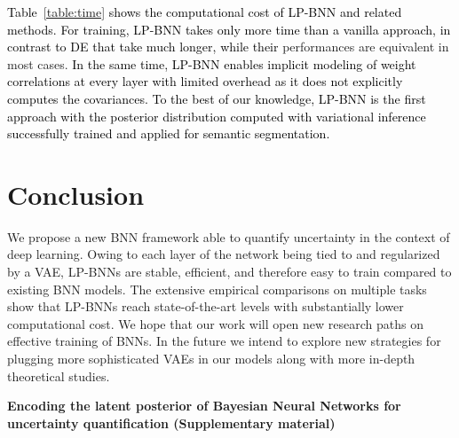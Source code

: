 \documentclass[10pt,twocolumn,letterpaper]{article}
\newcommand\Gianni{\textcolor{black}}
\newcommand{\ab}[1]{\textcolor{black}{#1}}
\begin{document}
\Gianni{Table~\ref{table:time} shows the computational cost of LP-BNN \ab{and related methods}. \ab{For training,} LP-BNN
\ab{takes only  more time than a vanilla approach, in contrast} to} 
\ab{DE} 
\ab{that take much longer, }
\ab{while their} performances are equivalent in most cases. 
\ab{In the same time, LP-BNN enables implicit modeling of weight correlations at every layer with limited overhead as it does not explicitly computes the covariances.}
\ab{To the best of our knowledge, LP-BNN is the first approach with the posterior distribution computed with variational inference successfully trained and applied for semantic segmentation.}


 
 



   
%
 
\section{Conclusion}
We propose a new BNN framework able to quantify uncertainty in the context of deep learning. Owing to each layer of the network being tied to and regularized by a VAE, LP-BNNs are stable, efficient, and therefore easy to train compared to existing BNN models. The extensive empirical comparisons on multiple tasks show that LP-BNNs reach state-of-the-art levels with substantially lower computational cost. We hope that our work will open new research paths on effective training of BNNs. In the future we intend to explore new strategies for plugging more sophisticated VAEs in our models along with more in-depth theoretical studies.

\clearpage
{\small


}

\clearpage



\clearpage
\begin{widetext}
\begin{center}
\textbf{\large Encoding the latent posterior of Bayesian Neural Networks for uncertainty quantification (Supplementary material)}
\end{center}
\end{widetext}

\setcounter{section}{0}
\setcounter{equation}{0}
\setcounter{figure}{0}
\setcounter{table}{0}


\renewcommand{\theequation}{S\arabic{equation}}
\renewcommand{\thefigure}{S\arabic{figure}}
\renewcommand{\thetable}{S\arabic{table}}
\renewcommand{\thesection}{\Alph{section}}
\end{document}
